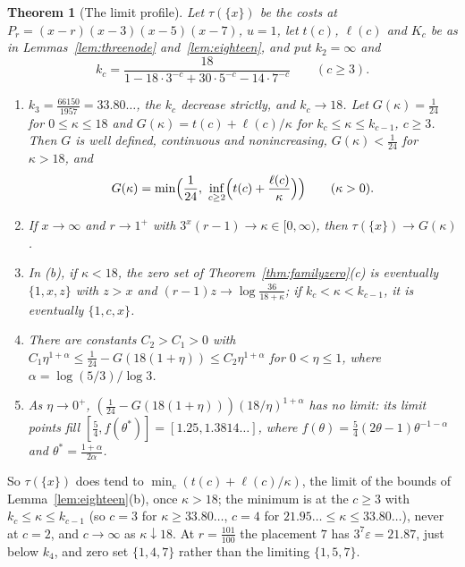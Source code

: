 \documentclass[11pt]{article}
\newtheorem{theorem}{Theorem}[section]
\begin{document}
\begin{theorem}[The limit profile]\label{thm:familylimit}
Let $\tau(\{x\})$ be the costs at $P_r=(x-r)(x-3)(x-5)(x-7)$, $u=1$, let
$t(c)$, $\ell(c)$ and $K_c$ be as in Lemmas~\ref{lem:threenode}
and~\ref{lem:eighteen}, and put $k_2=\infty$ and
\[
  k_c=\frac{18}{1-18\cdot3^{-c}+30\cdot5^{-c}-14\cdot7^{-c}}\qquad(c\ge3).
\]
\begin{enumerate}
\item[(a)] $k_3=\tfrac{66150}{1957}=33.80\ldots$, the $k_c$ decrease
strictly, and $k_c\to18$.  Let $G(\kappa)=\tfrac1{24}$ for
$0\le\kappa\le18$ and $G(\kappa)=t(c)+\ell(c)/\kappa$ for
$k_c\le\kappa\le k_{c-1}$, $c\ge3$.  Then $G$ is well defined, continuous and
nonincreasing, $G(\kappa)<\tfrac1{24}$ for $\kappa>18$, and
\[
  G(\kappa)=\min\Bigl(\frac1{24},\ \inf_{c\ge2}\Bigl(t(c)+\frac{\ell(c)}\kappa\Bigr)\Bigr)
  \qquad(\kappa>0).
\]
\item[(b)] If $x\to\infty$ and $r\to1^+$ with $3^x(r-1)\to\kappa\in[0,\infty)$,
then $\tau(\{x\})\to G(\kappa)$.
\item[(c)] In (b), if $\kappa<18$, the zero set of
Theorem~\ref{thm:familyzero}(c) is eventually $\{1,x,z\}$ with $z>x$ and
$(r-1)z\to\log\frac{36}{18+\kappa}$; if $k_c<\kappa<k_{c-1}$, it is eventually
$\{1,c,x\}$.
\item[(d)] There are constants $C_2>C_1>0$ with
$C_1\eta^{1+\alpha}\le\tfrac1{24}-G(18(1+\eta))\le C_2\eta^{1+\alpha}$ for
$0<\eta\le1$, where $\alpha=\log(5/3)/\log3$.
\item[(e)] As $\eta\to0^+$,
$(\tfrac1{24}-G(18(1+\eta)))(18/\eta)^{1+\alpha}$ has no limit: its limit
points fill $[\tfrac54,f(\theta^*)]=[1.25,1.3814\ldots]$, where
$f(\theta)=\tfrac54(2\theta-1)\theta^{-1-\alpha}$ and
$\theta^*=\tfrac{1+\alpha}{2\alpha}$.
\end{enumerate}
\end{theorem}

So $\tau(\{x\})$ does tend to $\min_c(t(c)+\ell(c)/\kappa)$, the limit of
the bounds of Lemma~\ref{lem:eighteen}(b), once $\kappa>18$; the minimum is
at the $c\ge3$ with $k_c\le\kappa\le k_{c-1}$ (so $c=3$ for
$\kappa\ge33.80\ldots$, $c=4$ for $21.95\ldots\le\kappa\le33.80\ldots$),
never at $c=2$, and $c\to\infty$ as $\kappa\downarrow18$.  At
$r=\tfrac{101}{100}$ the placement $7$ has $3^7\varepsilon=21.87$, just
below $k_4$, and zero set $\{1,4,7\}$ rather than the limiting $\{1,5,7\}$.
\end{document}
